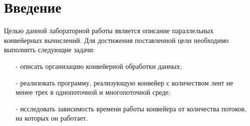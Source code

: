 \chapter*{Введение}

Целью данной лабораторной работы является описание параллельных конвейерных вычислений. Для достижения поставленной цели необходимо выполнить следующие задачи:
\begin{itemize}
	\item[-] описать организацию конвейерной обработки данных;
	\item[-] реализовать программу, реализующую конвейер с количеством лент не менее трех в однопоточной и многопоточной среде;
	\item[-] исследовать зависимость времени работы конвейера от количества потоков, на которых он работает.
\end{itemize}